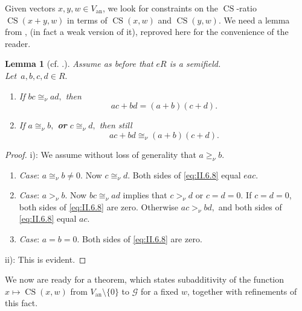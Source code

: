 \documentclass [12pt,a4paper,reqno]{amsart}
\newtheorem{lemma}[thm]{Lemma}
\begin{document}
Given vectors $x,y,w\in V_{\operatorname{an}}$, we look for constraints on the
${\operatorname{CS}}$-ratio ${\operatorname{CS}}(x+y,w)$ in terms of ${\operatorname{CS}}(x,w)$ and ${\operatorname{CS}}(y,w).$ We
need a lemma from \cite{IzhakianRowen2007SuperTropical}, (in fact a weak
version of it), reproved here for the convenience of the reader.

\begin{lemma}[cf. {\cite[Lemma 3.16.ii]{IzhakianRowen2007SuperTropical}}.]\label{lem:II.6.9} Assume
as before that $eR$ is a  semifield.\\ Let~$a,b,c,d\in R.$
\begin{enumerate}
\item[i)] If $bc\cong_\nu ad,$ then
\begin{equation}\label{eq:II.6.8}
ac+bd=(a+b)(c+d).\end{equation} \item[ii)] If $a\cong_\nu b,$
{\textbf{{or}}} $c\cong_\nu d,$ then  still
\begin{equation}\label{eq:II.6.9}
ac+bd\cong_\nu (a+b)(c+d).\end{equation}
\end{enumerate}
 \end{lemma}

\begin{proof}
i): We assume without loss of generality  that $a\ge_\nu
b.$

\begin{enumerate}
 \item[1.] \textit{Case}: $a\cong_\nu b\ne0.$ Now $c\cong_\nu d.$ Both
 sides of \eqref{eq:II.6.8}  equal $eac.$

  \item[2.] \textit{Case}: $a>_\nu b.$ Now $bc\cong_\nu ad$ implies that
  $c>_\nu d$ or $c=d=0.$ If $c=d=0$, both sides of \eqref{eq:II.6.8}
  are zero. Otherwise $ac>_\nu bd,$ and both sides of
  \eqref{eq:II.6.8} equal $ac.$

 \item[3.] \textit{Case}: $a=b=0.$ Both sides of \eqref{eq:II.6.8} are zero.
\end{enumerate}

 ii): This is evident.
\end{proof}

We now are ready for a theorem, which states subadditivity of the function $x \mapsto {\operatorname{CS}}(x,w)$ from $V_{\operatorname{an}} {\setminus} \{0 \}$ to ${\mathcal G}$ for a fixed $w$, together with refinements of this fact.
\end{document}

